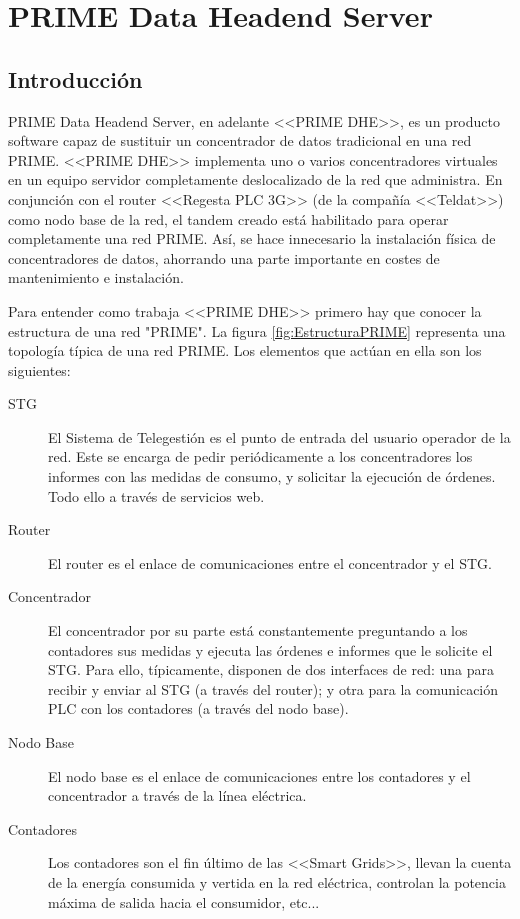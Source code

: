 \chapter{PRIME Data Headend Server}
\section{Introducción}
PRIME Data Headend Server, en adelante <<PRIME DHE>>, es un producto software capaz de sustituir un concentrador de datos tradicional en una red PRIME. <<PRIME DHE>> implementa uno o varios concentradores virtuales en un equipo servidor completamente deslocalizado de la red que administra. En conjunción con el router <<Regesta PLC 3G>> (de la compañía <<Teldat>>) como nodo base de la red, el tandem creado está habilitado para operar completamente una red PRIME. Así, se hace innecesario la instalación física de concentradores de datos, ahorrando una parte importante en costes de mantenimiento e instalación.

Para entender como trabaja <<PRIME DHE>>  primero hay que conocer la estructura de una red "PRIME". La figura \ref{fig:EstructuraPRIME} representa una topología típica de una red PRIME. Los elementos que actúan en ella son los siguientes:
\begin{description}
	\item[STG] El Sistema de Telegestión es el punto de entrada del usuario operador de la red. Este se encarga de pedir periódicamente a los concentradores los informes con las medidas de consumo, y solicitar la ejecución de órdenes. Todo ello a través de servicios web.
	\item[Router] El router es el enlace de comunicaciones entre el concentrador y el STG.
	\item[Concentrador] El concentrador por su parte está constantemente preguntando a los contadores sus medidas y ejecuta las órdenes e informes que le solicite el STG. Para ello, típicamente, disponen de dos interfaces de red: una para recibir y enviar al STG (a través del router); y otra para la comunicación PLC con los contadores (a través del nodo base).
	\item[Nodo Base] El nodo base es el enlace de comunicaciones entre los contadores y el concentrador a través de la línea eléctrica.
	\item[Contadores] Los contadores son el fin último de las <<Smart Grids>>, llevan la cuenta de la energía consumida y vertida en la red eléctrica, controlan la potencia máxima de salida hacia el consumidor, etc...
\end{description}


